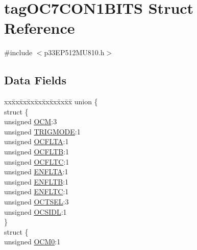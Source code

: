 \hypertarget{structtag_o_c7_c_o_n1_b_i_t_s}{}\section{tag\+O\+C7\+C\+O\+N1\+B\+I\+TS Struct Reference}
\label{structtag_o_c7_c_o_n1_b_i_t_s}


{\ttfamily \#include $<$p33\+E\+P512\+M\+U810.\+h$>$}

\subsection*{Data Fields}
\begin{DoxyCompactItemize}
\item 
\begin{tabbing}
xx\=xx\=xx\=xx\=xx\=xx\=xx\=xx\=xx\=\kill
union \{\\
\>struct \{\\
\>\>unsigned \hyperlink{structtag_o_c7_c_o_n1_b_i_t_s_a778fa0cf51a9477ac4e82d71a8733801}{OCM}:3\\
\>\>unsigned \hyperlink{structtag_o_c7_c_o_n1_b_i_t_s_a7a0057e0dca6e2663584b5b9e1da04c3}{TRIGMODE}:1\\
\>\>unsigned \hyperlink{structtag_o_c7_c_o_n1_b_i_t_s_acc967e41cecdeedc6ad4422f9ef1a6a3}{OCFLTA}:1\\
\>\>unsigned \hyperlink{structtag_o_c7_c_o_n1_b_i_t_s_a1fb30bb4421ef7c4bd0c66c379875593}{OCFLTB}:1\\
\>\>unsigned \hyperlink{structtag_o_c7_c_o_n1_b_i_t_s_a69a1772a4144abd579d17d28445b9934}{OCFLTC}:1\\
\>\>unsigned \hyperlink{structtag_o_c7_c_o_n1_b_i_t_s_a1e0f05fb23d516e003e4713fe8c1498a}{ENFLTA}:1\\
\>\>unsigned \hyperlink{structtag_o_c7_c_o_n1_b_i_t_s_a9d7aa97d5328b8b81ab7fd9145dfa0fc}{ENFLTB}:1\\
\>\>unsigned \hyperlink{structtag_o_c7_c_o_n1_b_i_t_s_a0b6f25c0f83f33b5501b6a2e6141a6ef}{ENFLTC}:1\\
\>\>unsigned \hyperlink{structtag_o_c7_c_o_n1_b_i_t_s_ae37d2a41dae2d2af1d82f7caae33cadb}{OCTSEL}:3\\
\>\>unsigned \hyperlink{structtag_o_c7_c_o_n1_b_i_t_s_afd05f4f249db4ef69b684e2f3fa6b703}{OCSIDL}:1\\
\>\} \\
\>struct \{\\
\>\>unsigned \hyperlink{structtag_o_c7_c_o_n1_b_i_t_s_a9271e84c9759ff10a7bc1cee3276e8f6}{OCM0}:1\\

\end{tabbing}
\end{DoxyCompactItemize}
